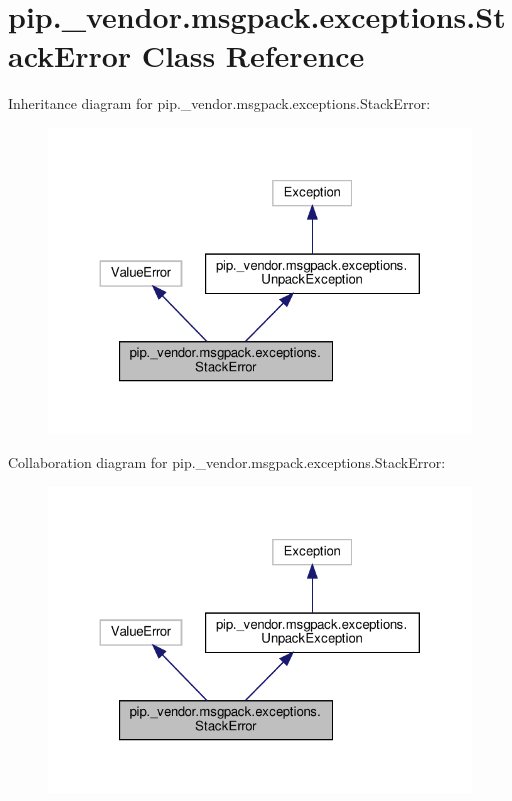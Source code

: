 \hypertarget{classpip_1_1__vendor_1_1msgpack_1_1exceptions_1_1StackError}{}\section{pip.\+\_\+vendor.\+msgpack.\+exceptions.\+Stack\+Error Class Reference}
\label{classpip_1_1__vendor_1_1msgpack_1_1exceptions_1_1StackError}


Inheritance diagram for pip.\+\_\+vendor.\+msgpack.\+exceptions.\+Stack\+Error\+:
\nopagebreak
\begin{figure}[H]
\begin{center}
\leavevmode
\includegraphics[width=324pt]{classpip_1_1__vendor_1_1msgpack_1_1exceptions_1_1StackError__inherit__graph}
\end{center}
\end{figure}


Collaboration diagram for pip.\+\_\+vendor.\+msgpack.\+exceptions.\+Stack\+Error\+:
\nopagebreak
\begin{figure}[H]
\begin{center}
\leavevmode
\includegraphics[width=324pt]{classpip_1_1__vendor_1_1msgpack_1_1exceptions_1_1StackError__coll__graph}
\end{center}
\end{figure}


